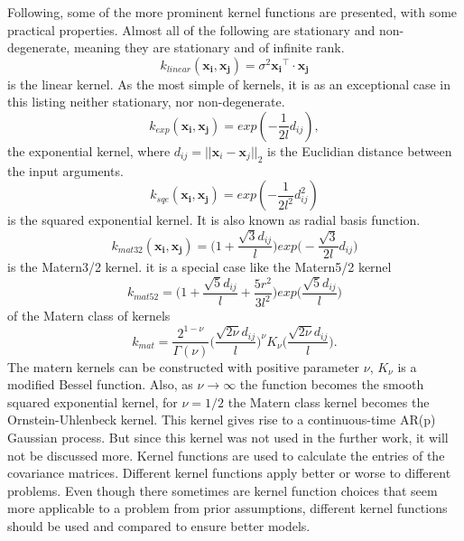Following, some of the more prominent kernel functions are presented, with some practical properties. Almost all of the following are stationary and non-degenerate, meaning they are stationary and of infinite rank.\newline
\begin{equation}%
	k_{linear}(\bm{x_i}, \bm{x_j}) = \sigma^2 \bm{x_i}^{\top} \cdot \bm{x_j} 
\label{eq:linear_kernel_function}
\end{equation}
is the linear kernel. As the most simple of kernels, it is as an exceptional case in this listing neither stationary, nor non-degenerate. 
\begin{equation}%
	k_{exp}(\bm{x_i}, \bm{x_j}) = exp(-\frac{1}{2l}d_{ij}),
\label{eq:exponential_kernel_function}
\end{equation}
the exponential kernel, where $d_{ij} = ||\bm{x}_i - \bm{x}_j||_2$ is the Euclidian distance between the input arguments. 
\begin{equation}%
	k_{sqe}(\bm{x_i}, \bm{x_j}) = exp(-\frac{1}{2l^2}d_{ij}^2)
\label{eq:squared_exponential_kernel}
\end{equation}
is the squared exponential kernel. It is also known as radial basis function. 
\begin{equation}%
	k_{mat32}(\bm{x_i}, \bm{x_j}) = \Bigg( 1 + \frac{\sqrt{3}d_{ij}}{l} \Bigg) exp \Bigg( - \frac{\sqrt{3}}{2l} d_{ij} \Bigg)
\label{eq:matern_32_kernel}
\end{equation}
is the Matern3/2 kernel. it is a special case like the Matern5/2 kernel
\begin{equation}%
	k_{mat52} = \Bigg( 1+ \frac{\sqrt{5}d_{ij}}{l} + \frac{5r^2}{3l^2} \Bigg)exp\Bigg( \frac{\sqrt{5}d_{ij}}{l} \Bigg)
\label{eq:matern_52_kernel}
\end{equation}
of the Matern class of kernels
\begin{equation}%
	k_{mat} = \frac{2^{1-\nu}}{\Gamma(\nu)} \Big( \frac{\sqrt{2\nu}d_{ij}}{l} \Big)^\nu K_\nu \Big( \frac{\sqrt{2 \nu}d_{ij}}{l} \Big) .
\label{eq:matern_kernel_class}
\end{equation}
The matern kernels can be constructed with positive parameter $\nu$, $K_\nu$ is a modified Bessel function. Also, as $\nu \to \infty$ the function becomes the smooth squared exponential kernel, for $\nu = 1/2$ the Matern class kernel becomes the Ornstein-Uhlenbeck kernel. This kernel gives rise to a continuous-time AR(p) Gaussian process. But since this kernel was not used in the further work, it will not be discussed more. Kernel functions are used to calculate the entries of the covariance matrices. Different kernel functions apply better or worse to different problems. Even though there sometimes are kernel function choices that seem more applicable to a problem from prior assumptions, different kernel functions should be used and compared to ensure better models. 
